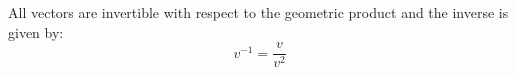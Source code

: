\begin{lemma}\label{l:invertibility}
	All vectors are invertible with respect to the geometric product and the inverse is given by:
	\[v^{-1} = \frac{v}{v^2}\]
\end{lemma}

